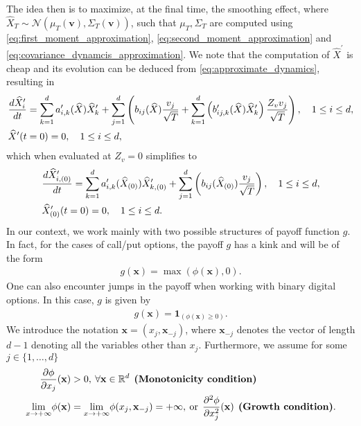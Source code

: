 The idea then is to maximize, at the final time, the smoothing effect, where $\hat{X}_T \sim \mathcal{N}(\mu_T(\mathbf{v}), \Sigma_T(\mathbf{v}))$, such that $\mu_T, \Sigma_T$ are computed using   \eqref{eq:first_moment_approximation}, \eqref{eq:second_moment_approximation} and \eqref{eq:covariance_dynamcis_approximation}. We note that the computation of $\hat{X}^\prime$ is cheap and its evolution can be deduced from \eqref{eq:approximate_dynamics}, resulting in
\begin{align*}
&\frac{d\widehat{X}^\prime_i}{dt}=\sum_{k=1}^d a^\prime_{i,k}(\widehat{X}) \widehat{X}^\prime_k+\sum_{j=1}^d  \left(b_{ij}(\widehat{X})\frac{ v_j}{\sqrt{T}}+ \sum_{k=1}^d \left(b^\prime_{ij,k}(\widehat{X}) \widehat{X}^\prime_k \right) \frac{Z_v v_j}{\sqrt{T}}\right), \quad  1 \le i \le d , \nonumber\\
&\widehat{X}^\prime(t=0)=0, \quad  1 \le i \le d ,
\end{align*}
which when evaluated at $Z_v=0$ simplifies to
\begin{align*}
&\frac{d\widehat{X}^\prime_{i,(0)}}{dt}=\sum_{k=1}^d a^\prime_{i,k}(\widehat{X}_{(0)}) \widehat{X}^\prime_{k,(0)}+\sum_{j=1}^d  \left(b_{ij}(\widehat{X}_{(0)})\frac{ v_j}{\sqrt{T}}\right), \quad  1 \le i \le d , \nonumber\\
&\widehat{X}_{(0)}^\prime(t=0)=0, \quad  1 \le i \le d .
\end{align*}
In our context, we work mainly with two possible structures of payoff function $g$. In fact, for the cases of call/put options, the payoff $g$ has a kink and  will be of the form 
\begin{align}\label{eq:call_option}
g(\mathbf{x})=\max(\phi(\mathbf{x}),0).
\end{align}
One can also encounter jumps in the payoff when working with binary digital options. In this case, $g$ is given by 
\begin{align}\label{eq:binary_option}
	g(\mathbf{x})=\mathbf{1}_{(\phi(\mathbf{x}) \ge 0)}.
\end{align}
We introduce the notation $\mathbf{x}=(x_j,\mathbf{x}_{-j})$, where $\mathbf{x}_{-j}$ denotes the vector of length $d-1$ denoting all the variables other than $x_j$. Furthermore, we assume for some $j \in \{1,\dots,d\}$
\begin{align}
	\frac{\partial \phi}{\partial x_j}(\mathbf{x}) &>0,\: \forall \mathbf{x} \in \mathbb{R}^d \: \: \textbf{(Monotonicity condition)}  \label{assump:Monotonicity condition}\\
	\underset{x \rightarrow +\infty}{\lim} \phi(\mathbf{x})&=\underset{x \rightarrow +\infty}{\lim} \phi(x_j,\mathbf{x}_{-j})=+\infty, \: \text{or} \:\: \frac{\partial^2 \phi} {\partial x_j^2}(\mathbf{x}) \: \: \textbf{(Growth condition)}  \label{assump:Growth condition} .
\end{align}
